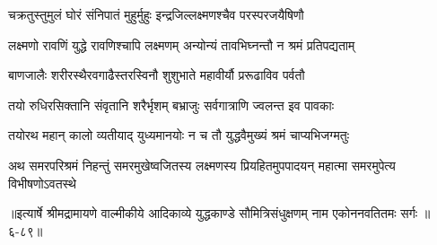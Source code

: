 \twolineshloka
{चक्रतुस्तुमुलं घोरं संनिपातं मुहुर्मुहुः}
{इन्द्रजिल्लक्ष्मणश्चैव परस्परजयैषिणौ} %

\twolineshloka
{लक्ष्मणो रावणिं युद्धे रावणिश्चापि लक्ष्मणम्}
{अन्योन्यं तावभिघ्नन्तौ न श्रमं प्रतिपद्यताम्} %

\twolineshloka
{बाणजालैः शरीरस्थैरवगाढैस्तरस्विनौ}
{शुशुभाते महावीर्यौ प्ररूढाविव पर्वतौ} %

\twolineshloka
{तयो रुधिरसिक्तानि संवृतानि शरैर्भृशम्}
{बभ्राजुः सर्वगात्राणि ज्वलन्त इव पावकाः} %

\twolineshloka
{तयोरथ महान् कालो व्यतीयाद् युध्यमानयोः}
{न च तौ युद्धवैमुख्यं श्रमं चाप्यभिजग्मतुः} %

\twolineshloka
{अथ समरपरिश्रमं निहन्तुं समरमुखेष्वजितस्य लक्ष्मणस्य}
{प्रियहितमुपपादयन् महात्मा समरमुपेत्य विभीषणोऽवतस्थे} %


॥इत्यार्षे श्रीमद्रामायणे वाल्मीकीये आदिकाव्ये युद्धकाण्डे सौमित्रिसंधुक्षणम् नाम एकोननवतितमः सर्गः ॥६-८९॥
